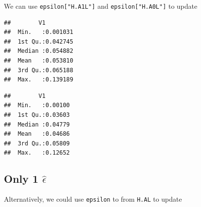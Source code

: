 \documentclass[
]{book}
\newenvironment{Shaded}{\begin{snugshade}}{\end{snugshade}}
\newcommand{\FunctionTok}[1]{\textcolor[rgb]{0.00,0.00,0.00}{#1}}
\newcommand{\NormalTok}[1]{#1}
\newcommand{\OtherTok}[1]{\textcolor[rgb]{0.56,0.35,0.01}{#1}}
\newcommand{\SpecialCharTok}[1]{\textcolor[rgb]{0.00,0.00,0.00}{#1}}
\newcommand{\StringTok}[1]{\textcolor[rgb]{0.31,0.60,0.02}{#1}}
\begin{document}
We can use \texttt{epsilon{[}"H.A1L"{]}} and \texttt{epsilon{[}"H.A0L"{]}} to update

\begin{Shaded}
\end{Shaded}

\begin{verbatim}
##        V1          
##  Min.   :0.001031  
##  1st Qu.:0.042745  
##  Median :0.054882  
##  Mean   :0.053810  
##  3rd Qu.:0.065188  
##  Max.   :0.139189
\end{verbatim}

\begin{Shaded}
\end{Shaded}

\begin{verbatim}
##        V1         
##  Min.   :0.00100  
##  1st Qu.:0.03603  
##  Median :0.04779  
##  Mean   :0.04686  
##  3rd Qu.:0.05809  
##  Max.   :0.12652
\end{verbatim}

\hypertarget{only-1-hatepsilon-1}{%
\subsection{\texorpdfstring{Only 1 \(\hat\epsilon\)}{Only 1 \textbackslash hat\textbackslash epsilon}}\label{only-1-hatepsilon-1}}

Alternatively, we could use \texttt{epsilon} to from \texttt{H.AL} to update
\end{document}
